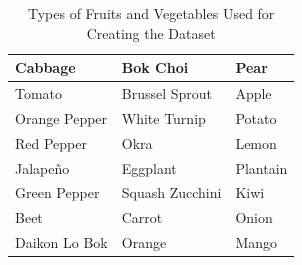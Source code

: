 \bgroup
\def\arraystretch{1.5}
\begin{table}[htbp]
	\caption{Types of Fruits and Vegetables Used for Creating the Dataset}
	\begin{center}
		\begin{tabular}{| >{\centering\arraybackslash}m{2cm} | >{\centering\arraybackslash}m{2cm} | >{\centering\arraybackslash}m{2cm} |}
			\hline
			Cabbage & Bok Choi & Pear \\
			\hline
			Tomato & Brussel Sprout & Apple \\
			\hline
			Orange Pepper & White Turnip & Potato \\
			\hline
			Red Pepper & Okra & Lemon \\
			\hline
			Jalapeño & Eggplant & Plantain \\
			\hline
			Green Pepper & Squash Zucchini & Kiwi \\
			\hline
			Beet & Carrot & Onion \\
			\hline
			Daikon Lo Bok & Orange & Mango \\
			\hline
		\end{tabular}
		\label{tab:veg_types}
	\end{center}
\end{table}
\egroup